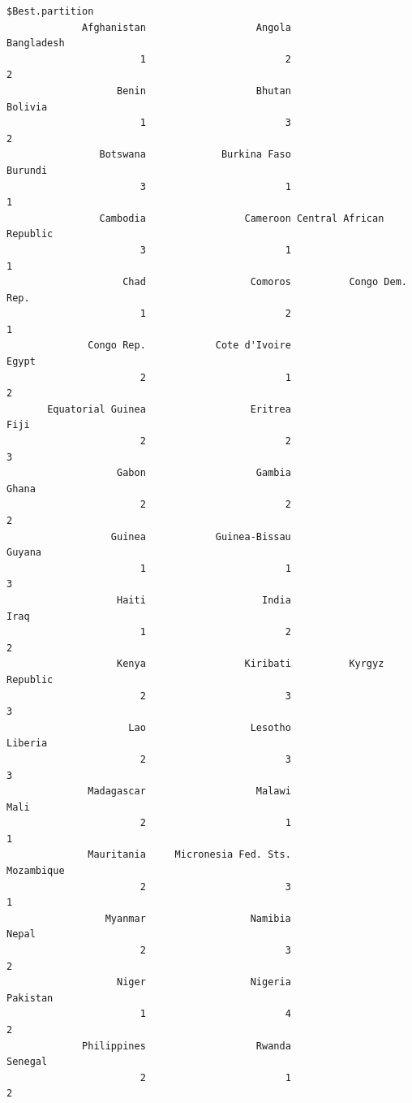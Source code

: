 \documentclass[
]{article}
\begin{document}
\begin{verbatim}
$Best.partition
             Afghanistan                   Angola               Bangladesh 
                       1                        2                        2 
                   Benin                   Bhutan                  Bolivia 
                       1                        3                        2 
                Botswana             Burkina Faso                  Burundi 
                       3                        1                        1 
                Cambodia                 Cameroon Central African Republic 
                       3                        1                        1 
                    Chad                  Comoros          Congo Dem. Rep. 
                       1                        2                        1 
              Congo Rep.            Cote d'Ivoire                    Egypt 
                       2                        1                        2 
       Equatorial Guinea                  Eritrea                     Fiji 
                       2                        2                        3 
                   Gabon                   Gambia                    Ghana 
                       2                        2                        2 
                  Guinea            Guinea-Bissau                   Guyana 
                       1                        1                        3 
                   Haiti                    India                     Iraq 
                       1                        2                        2 
                   Kenya                 Kiribati          Kyrgyz Republic 
                       2                        3                        3 
                     Lao                  Lesotho                  Liberia 
                       2                        3                        3 
              Madagascar                   Malawi                     Mali 
                       2                        1                        1 
              Mauritania     Micronesia Fed. Sts.               Mozambique 
                       2                        3                        1 
                 Myanmar                  Namibia                    Nepal 
                       2                        3                        2 
                   Niger                  Nigeria                 Pakistan 
                       1                        4                        2 
             Philippines                   Rwanda                  Senegal 
                       2                        1                        2 

\end{verbatim}
\end{document}
